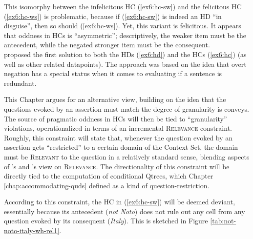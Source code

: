 This isomorphy between the infelicitous HC (\ref{ex6:hc-sw}) and the felicitous HC (\ref{ex6:hc-ws}) is problematic, because if (\ref{ex6:hc-sw}) is indeed an HD ``in disguise'', then so should (\ref{ex6:hc-ws}). Yet, this variant is felicitous. It appears that oddness in HCs is ``asymmetric''; descriptively,  the weaker item must be the antecedent, while the negated stronger item must be the consequent.\\


\textcite{Kalomoiros2024} proposed the first solution to both the HDs (\ref{ex6:hd}) and  the HCs (\ref{ex6:hc}) (as well as other related datapoints). The approach was based on the idea that overt negation has a special status when it comes to evaluating if a sentence is redundant.

This Chapter argues for an alternative view, building on the idea that the questions evoked by an assertion must match the degree of granularity is conveys. The source of pragmatic oddness in HCs will then be tied to ``granularity'' violations, operationalized in terms of an incremental \textsc{Relevance} constraint. Roughly, this constraint will state that, whenever the question evoked by an assertion gets ``restricted'' to a certain domain of the Context Set, the domain must be \textsc{Relevant} to the question in a relatively standard sense, blending aspects of \citeauthor*{Lewis1988}'s and \citeauthor{Roberts2012}'s view on \textsc{Relevance}. The directionality of this constraint will be directly tied to the computation of conditional Qtrees, which Chapter \ref{chap:accommodating-quds} defined as a kind of question-restriction.

According to this constraint, the HC in (\ref{ex6:hc-sw}) will be deemed deviant, essentially because its antecedent (\textit{not Noto}) does not rule out any cell from any question evoked by its consequent (\textit{Italy}). This is sketched in Figure \ref{tab:not-noto-italy-wh-rel1}.

